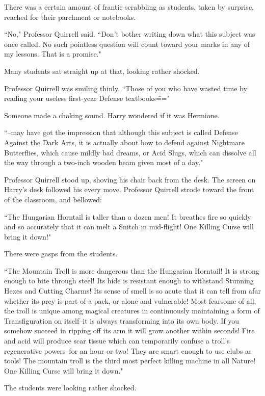 There was a certain amount of frantic scrabbling as students, taken by surprise, reached for their parchment or notebooks.

``No," Professor Quirrell said. ``Don't bother writing down what this subject was once called. No such pointless question will count toward your marks in any of my lessons. That is a promise."

Many students sat straight up at that, looking rather shocked.

Professor Quirrell was smiling thinly. ``Those of you who have wasted time by reading your useless first-year Defense textbooks\==="

Someone made a choking sound. Harry wondered if it was Hermione.

``\---may have got the impression that although this subject is called Defense Against the Dark Arts, it is actually about how to defend against Nightmare Butterflies, which cause mildly bad dreams, or Acid Slugs, which can dissolve all the way through a two-inch wooden beam given most of a day."

Professor Quirrell stood up, shoving his chair back from the desk. The screen on Harry's desk followed his every move. Professor Quirrell strode toward the front of the classroom, and bellowed:

``The Hungarian Horntail is taller than a dozen men! It breathes fire so quickly and so accurately that it can melt a Snitch in mid-flight! One Killing Curse will bring it down!"

There were gasps from the students.

``The Mountain Troll is more dangerous than the Hungarian Horntail! It is strong enough to bite through steel! Its hide is resistant enough to withstand Stunning Hexes and Cutting Charms! Its sense of smell is so acute that it can tell from afar whether its prey is part of a pack, or alone and vulnerable! Most fearsome of all, the troll is unique among magical creatures in continuously maintaining a form of Transfiguration on itself\---it is always transforming into its own body. If you somehow succeed in ripping off its arm it will grow another within seconds! Fire and acid will produce scar tissue which can temporarily confuse a troll's regenerative powers\---for an hour or two! They are smart enough to use clubs as tools! The mountain troll is the third most perfect killing machine in all Nature! One Killing Curse will bring it down."

The students were looking rather shocked.

